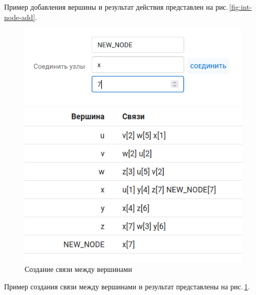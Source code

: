 Пример добавления вершины и результат действия представлен на
рис.\,\ref{fig:int-node-add}.

\begin{figure}
  \begin{minipage}{0.5\textwidth}
    \centering\includegraphics[width=0.8\linewidth]{figs/task-1/int-12.png}
  \end{minipage}
  \begin{minipage}{0.5\textwidth}
    \centering\includegraphics[width=0.8\linewidth]{figs/task-1/int-8.png}
  \end{minipage}
  \caption{Создание связи между вершинами}
  \label{fig:int-connect-nodes}
\end{figure}

Пример создания связи между вершинами и результат представлены
на рис.\,\ref{fig:int-connect-nodes}.

